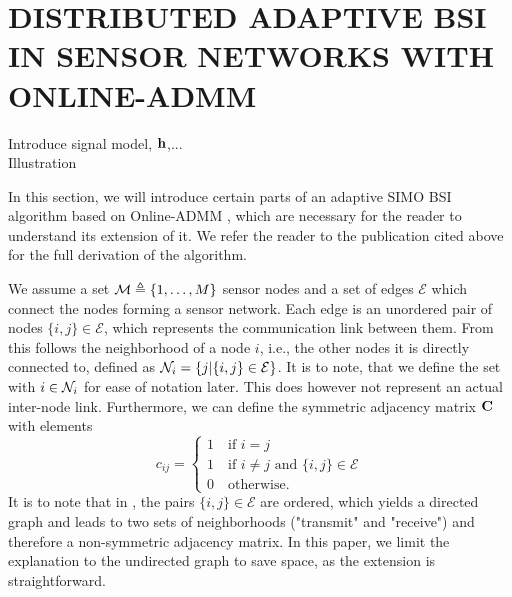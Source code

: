 \documentclass{article}
\begin{document}
\section{DISTRIBUTED ADAPTIVE BSI IN SENSOR NETWORKS WITH ONLINE-ADMM}
\label{sec:dbsi}
\begin{todo}
    Introduce signal model, \(\bm{\mathrm{h}}\),...\\
    Illustration
\end{todo}
In this section, we will introduce certain parts of an adaptive SIMO BSI algorithm based on Online-ADMM \cite{blochbergerDBSI}, which are necessary for the reader to understand its extension of it.
We refer the reader to the publication cited above for the full derivation of the algorithm.

We assume a set \(\mathcal{M} \triangleq \{1,\ldots,M\}\) sensor nodes and a set of edges \(\mathcal{E}\) which connect the nodes forming a sensor network.
Each edge is an unordered pair of nodes \(\{i,j\} \in \mathcal{E}\), which represents the communication link between them.
From this follows the neighborhood of a node \(i\), i.e., the other nodes it is directly connected to, defined as \(\mathcal{N}_i = \{j|\{i,j\} \in \mathcal{E}\}\).
It is to note, that we define the set with \(i \in \mathcal{N}_i\) for ease of notation later.
This does however not represent an actual inter-node link.
Furthermore, we can define the symmetric adjacency matrix \(\bm{\mathrm{C}}\) with elements
\begin{equation}
    c_{ij} = \begin{cases}
        1 \quad \text{if } i = j\\
        1 \quad \text{if } i \neq j \text{ and }\{i,j\} \in \mathcal{E}\\
        0 \quad \text{otherwise}.
    \end{cases}
\end{equation}
It is to note that in \cite{blochbergerDBSI}, the pairs \(\{i,j\} \in \mathcal{E}\) are ordered, which yields a directed graph and leads to two sets of neighborhoods ("transmit" and "receive") and therefore a non-symmetric adjacency matrix.
In this paper, we limit the explanation to the undirected graph to save space, as the extension is straightforward.
\end{document}
